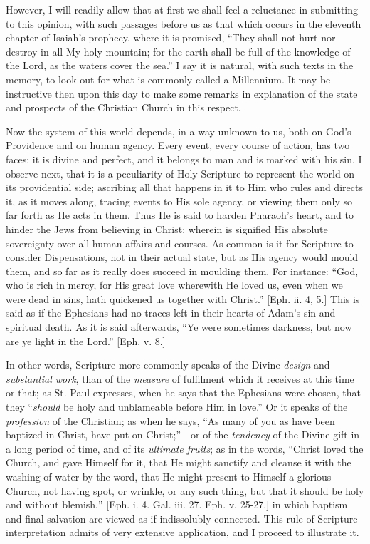 However, I will readily allow that at first we shall feel a
reluctance in submitting to this opinion, with such passages before us
as that which occurs in the eleventh chapter of Isaiah's prophecy,
where it is promised, ``They shall not hurt nor destroy in all My
holy mountain; for the earth shall be full of the knowledge of the
Lord, as the waters cover the sea.'' I say it is natural, with
such texts in the memory, to look out for what is commonly called a
Millennium. It may be instructive then upon this day to make some
remarks in explanation of the state and prospects of the Christian
Church in this respect.

Now the system of this world depends, in a way unknown to us, both
on God's Providence and on human agency. Every event, every course of
action, has two faces; it is divine and perfect, and it belongs to man
and is marked with his sin. I observe next, that it is a peculiarity
of Holy Scripture to represent the world on its providential side;
ascribing all that happens in it to Him who rules and directs it, as
it moves along, tracing events to His sole agency, or viewing them
only so far forth as He acts in them. Thus He is said to harden
Pharaoh's heart, and to hinder the Jews from believing in Christ;
wherein is signified His absolute sovereignty over all human affairs
and courses. As common is it for Scripture to consider Dispensations,
not in their actual state, but as His agency would mould them, and so
far as it really does succeed in moulding them. For instance:
``God, who is rich in mercy, for His great love wherewith He loved
us, even when we were dead in sins, hath quickened us together with
Christ.'' [Eph. ii. 4, 5.] This is said as if the Ephesians had no
traces left in their hearts of Adam's sin and spiritual death. As it
is said afterwards, ``Ye were sometimes darkness, but now are ye
light in the Lord.'' [Eph. v. 8.]

In other words, Scripture more commonly speaks of the Divine \emph{design}
and \emph{substantial work}, than of the \emph{measure} of fulfilment
which it receives at this time or that; as St. Paul expresses, when he
says that the Ephesians were chosen, that they ``\emph{should} be
holy and unblameable before Him in love.'' Or it speaks of the \emph{profession}
of the Christian; as when he says, ``As many of you as have been
baptized in Christ, have put on Christ;''—or of the \emph{tendency}
of the Divine gift in a long period of time, and of its \emph{ultimate
fruits}; as in the words, ``Christ loved the Church, and gave
Himself for it, that He might sanctify and cleanse it with the washing
of water by the word, that He might present to Himself a glorious
Church, not having spot, or wrinkle, or any such thing, but that it
should be holy and without blemish,'' [Eph. i. 4. Gal. iii. 27.
Eph. v. 25-27.] in which baptism and final salvation are viewed as if
indissolubly connected. This rule of Scripture interpretation admits
of very extensive application, and I proceed to illustrate it.

